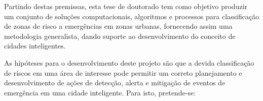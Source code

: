 \begin{refsection}
Partindo destas premissas, esta tese de doutorado tem como objetivo produzir um conjunto de soluções computacionais, algoritmos e processos para classificação de zonas de risco a emergências em zonas urbanas, fornecendo assim uma metodologia generalista, dando suporte ao desenvolvimento do conceito de cidades inteligentes.


As hipóteses para o desenvolvimento deste projeto são que a devida classificação de riscos em uma área de interesse pode permitir um correto planejamento e desenvolvimento de ações de detecção, alerta e mitigação de eventos de emergência em uma cidade inteligente. Para isto, pretende-se:


\end{refsection}
